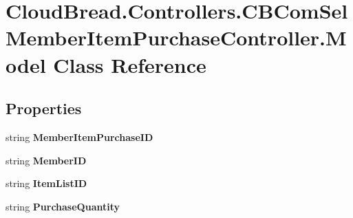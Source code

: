 \hypertarget{class_cloud_bread_1_1_controllers_1_1_c_b_com_sel_member_item_purchase_controller_1_1_model}{}\section{Cloud\+Bread.\+Controllers.\+C\+B\+Com\+Sel\+Member\+Item\+Purchase\+Controller.\+Model Class Reference}
\label{class_cloud_bread_1_1_controllers_1_1_c_b_com_sel_member_item_purchase_controller_1_1_model}
\subsection*{Properties}
\begin{DoxyCompactItemize}
\item 
string {\bfseries Member\+Item\+Purchase\+ID}\hypertarget{class_cloud_bread_1_1_controllers_1_1_c_b_com_sel_member_item_purchase_controller_1_1_model_a6a972fa72f6521542cd30dc4fdfc6ed2}{}\label{class_cloud_bread_1_1_controllers_1_1_c_b_com_sel_member_item_purchase_controller_1_1_model_a6a972fa72f6521542cd30dc4fdfc6ed2}

\item 
string {\bfseries Member\+ID}\hypertarget{class_cloud_bread_1_1_controllers_1_1_c_b_com_sel_member_item_purchase_controller_1_1_model_aa6d52584f90d94d0f5752312954669dd}{}\label{class_cloud_bread_1_1_controllers_1_1_c_b_com_sel_member_item_purchase_controller_1_1_model_aa6d52584f90d94d0f5752312954669dd}

\item 
string {\bfseries Item\+List\+ID}\hypertarget{class_cloud_bread_1_1_controllers_1_1_c_b_com_sel_member_item_purchase_controller_1_1_model_a8d002dde95b3d4322b8c602e5db97870}{}\label{class_cloud_bread_1_1_controllers_1_1_c_b_com_sel_member_item_purchase_controller_1_1_model_a8d002dde95b3d4322b8c602e5db97870}

\item 
string {\bfseries Purchase\+Quantity}\hypertarget{class_cloud_bread_1_1_controllers_1_1_c_b_com_sel_member_item_purchase_controller_1_1_model_a60305a2d1b730c076edcaf2014993bec}{}\label{class_cloud_bread_1_1_controllers_1_1_c_b_com_sel_member_item_purchase_controller_1_1_model_a60305a2d1b730c076edcaf2014993bec}


\end{DoxyCompactItemize}
